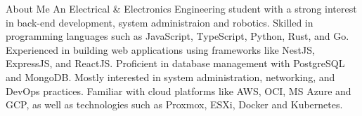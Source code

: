 \begin{rubric}{About Me}
	\entry*[] An Electrical \& Electronics Engineering student with a strong interest in back-end development, system administraion and robotics. 
	\entry*[] Skilled in programming languages such as JavaScript, TypeScript, Python, Rust, and Go. Experienced in building web applications using frameworks like NestJS, ExpressJS, and ReactJS. Proficient in database management with PostgreSQL and MongoDB.
	\entry*[] Mostly interested in system administration, networking, and DevOps practices. Familiar with cloud platforms like AWS, OCI, MS Azure and GCP, as well as technologies such as Proxmox, ESXi, Docker and Kubernetes.
\end{rubric}

